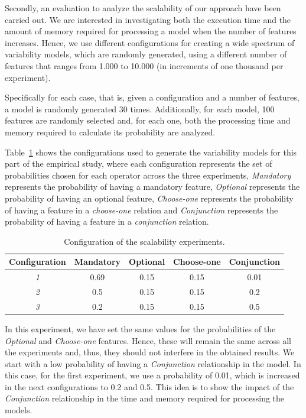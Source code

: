 Secondly, an evaluation to analyze the scalability of our approach
have been carried out. We are interested in investigating both the
execution time and the amount of memory required for processing a model
when the number of features increases.
Hence, we use different configurations for creating a wide
spectrum of variability models, which are randomly generated,
using a different number of features that ranges from 1.000 to 10.000 (in increments of one thousand per experiment).

Specifically for each case, that is, given a configuration and a number of features,
a model is randomly generated 30 times.
Additionally, for each model, 100 features are 
randomly selected and, for each one, both the processing time and memory
required to calculate its probability are analyzed.



Table~\ref{scalaExperiment} shows the configurations used to generate the
variability models for this part of the empirical study, 
where each configuration represents the set of probabilities chosen for each operator across the three experiments, 
 \textit{Mandatory} represents the probability of having a mandatory feature, 
 \textit{Optional} represents the probability of having an optional feature,
 \textit{Choose-one} represents the probability of having a feature in a \textit{choose-one} relation and
 \textit{Conjunction} represents the probability of having a feature in a \textit{conjunction} relation.

\begin{table}[h]
\centering
\begin{tabular}{|c|c|c|c|c|}
\hline
\textbf{Configuration} & \textbf{Mandatory} &  \textbf{Optional} &  \textbf{Choose-one} &  \textbf{Conjunction} \\ \hline
	\textit{1}		& 0.69	& 0.15	& 0.15	& 0.01 	\\ \hline
	\textit{2}		& 0.5		& 0.15 	& 0.15	& 0.2		\\ \hline
	\textit{3}		& 0.2		& 0.15 	& 0.15 	& 0.5 	\\ \hline
\end{tabular}
\caption{Configuration of the scalability experiments.}
\label{scalaExperiment}
\end{table}

In this experiment, we have set the same values for the probabilities of the \textit{Optional} 
and \textit{Choose-one} features. Hence, these will remain the same 
across all the experiments and, thus, they should not interfere in the obtained results.
We start with a low probability of having a \textit{Conjunction} relationship in the model. In this 
case, for the first experiment, we use a probability of 0.01, which is increased in the next configurations
to 0.2 and 0.5. This idea is to show the impact of the \textit{Conjunction} relationship in the time 
and memory required for processing the models.


